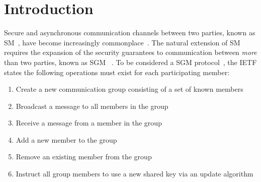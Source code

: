 \documentclass[runningheads]{llncs}
\newcommand{\Abrev}[1]{\gls{#1}}
\begin{document}

%
%
%

%
%


\section{Introduction}

Secure and asynchronous communication channels between two parties, known as \Abrev{SM}~\cite{unger2015sok}, have become increasingly commonplace~\cite{schroder2016signal,vaziripour2017you,jahn2018usability}.
The natural extension of \Abrev{SM} requires the expansion of the security guarantees to communication between \emph{more} than two parties, known as \Abrev{SGM} ~\cite{cohn2018ends}.
To be considered a \Abrev{SGM} protocol~\cite{ietf-mls-protocol-14}, the \Abrev{IETF} states the following operations must exist for each participating member:

\begin{enumerate}
\item Create a new communication group consisting of a set of known members
\item Broadcast a message to all members in the group
\item Receive a message from a member in the group
\item Add a new member to the group
\item Remove an existing member from the group
\item Instruct all group members to use a new shared key via an update algorithm
\end{enumerate}
\end{document}
